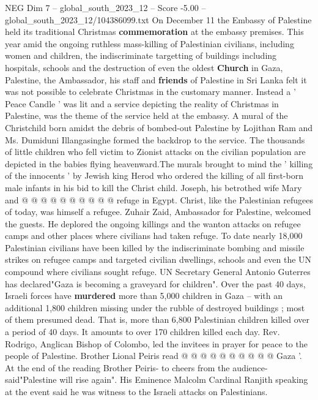 \begin{textsample}{NEG Dim 7 – global\_south\_2023\_12 – Score -5.00 – global\_south\_2023\_12/104386099.txt}  \label{ex:f7_neg_417}
On December 11 the Embassy of Palestine held its traditional Christmas \textbf{commemoration} at the embassy premises.
This year amid the ongoing ruthless mass-killing of Palestinian civilians, including women and children, the indiscriminate targetting of buildings including hospitals, schools and the destruction of even the oldest \textbf{Church} in Gaza, Palestine, the Ambassador, his staff and \textbf{friends} of Palestine in Sri Lanka felt it was not possible to celebrate Christmas in the customary manner.
Instead a ' Peace Candle ' was lit and a service depicting the reality of Christmas in Palestine, was the theme of the service held at the embassy.
A mural of the Christchild born amidst the debris of bombed-out Palestine by Lojithan Ram and Ms.
Dumiduni Illangasinghe formed the backdrop to the service.
The thousands of little children who fell victim to Zionist attacks on the civilian population are depicted in the babies flying heavenward.The murals brought to mind the ' killing of the innocents ' by Jewish king Herod who ordered the killing of all first-born male infants in his bid to kill the Christ child.
Joseph, his betrothed wife Mary and @ @ @ @ @ @ @ @ @ @ refuge in Egypt.
Christ, like the Palestinian refugees of today, was himself a refugee.
Zuhair Zaid, Ambassador for Palestine, welcomed the guests.
He deplored the ongoing killings and the wanton attacks on refugee camps and other places where civilians had taken refuge.
To date nearly 18,000 Palestinian civilians have been killed by the indiscriminate bombing and missile strikes on refugee camps and targeted civilian dwellings, schools and even the UN compound where civilians sought refuge.
UN Secretary General Antonio Guterres has declared"Gaza is becoming a graveyard for children".
Over the past 40 days, Israeli forces have \textbf{murdered} more than 5,000 children in Gaza -- with an additional 1,800 children missing under the rubble of destroyed buildings ; most of them presumed dead.
That is, more than 6,800 Palestinian children killed over a period of 40 days.
It amounts to over 170 children killed each day.
Rev.
Rodrigo, Anglican Bishop of Colombo, led the invitees in prayer for peace to the people of Palestine.
Brother Lional Peiris read @ @ @ @ @ @ @ @ @ @ Gaza '.
At the end of the reading Brother Peiris- to cheers from the audience- said"Palestine will rise again".
His Eminence Malcolm Cardinal Ranjith speaking at the event said he was witness to the Israeli attacks on Palestinians.

\end{textsample}
